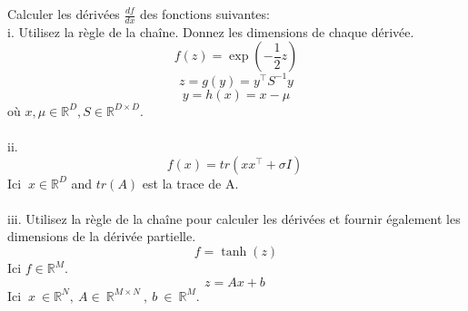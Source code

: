 \begin{enumerate}
{{	      }
	      {Calculer les dérivées $\frac{df}{dx}$ des fonctions suivantes:\\
	      i. Utilisez la règle de la chaîne. Donnez les dimensions de chaque dérivée.\\
	      $$f\left(z\right)=\exp\left(-\frac{1}{2}z\right)$$
	      $$z=g\left(y\right)=y^{\top}S^{-1}y$$
	      $$y=h\left(x\right)=x-\mu$$
	      où $x, \mu \in \mathbb{R}^D, S \in \mathbb{R}^{D \times D}$.\\~\\
	      ii. $$f\left(x\right)=tr\left(xx^{\top}+\sigma I\right)\:$$
	      Ici $\:x\in \mathbb{R}^D$ and $tr\left(A\right)$ est la trace de A.\\~\\
	      iii. Utilisez la règle de la chaîne pour calculer les dérivées et fournir également les dimensions de la dérivée partielle.\\
	      $$f=\tanh\left(z\right)$$
	      Ici $f \in \mathbb{R}^M$.
	      $$z=Ax+b\:$$
	      Ici $\:x\:\in \mathbb{R}^N,\:A\in \:\mathbb{R}^{M \times N}\:,\:b\:\in \:\mathbb{R}^M$.\\~\\
	      }
	      }

\end{enumerate}